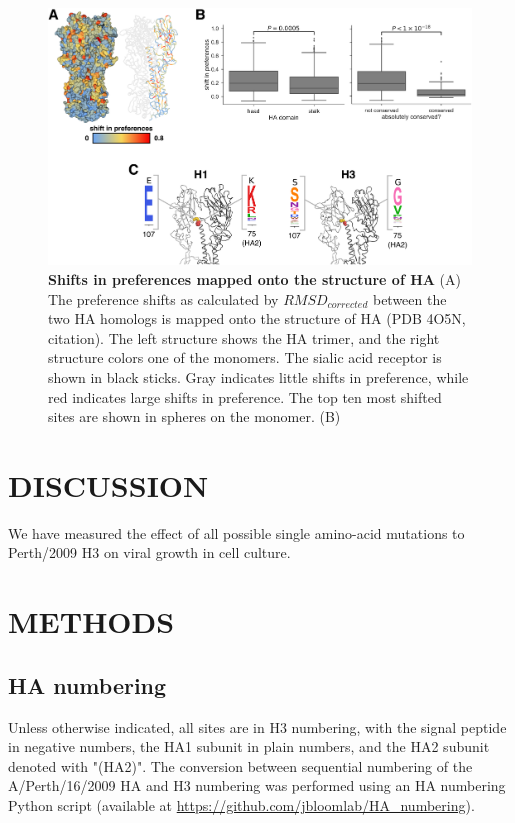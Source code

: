 \documentclass[11pt]{article}
\begin{document}
\begin{figure}
\centerline{\includegraphics[width=\textwidth]{figs/RMSD_heatmap/RMSD_heatmap.pdf}}
\caption{\label{fig:RMSD_heatmap}
{\bf Shifts in preferences mapped onto the structure of HA}
(A) The preference shifts as calculated by $RMSD_{corrected}$ between the two HA homologs is mapped onto the structure of HA (PDB 4O5N, citation). 
The left structure shows the HA trimer, and the right structure colors one of the monomers. 
The sialic acid receptor is shown in black sticks.
Gray indicates little shifts in preference, while red indicates large shifts in preference.
The top ten most shifted sites are shown in spheres on the monomer.
(B)
}
\end{figure}


\section*{DISCUSSION}
We have measured the effect of all possible single amino-acid mutations to Perth/2009 H3 on viral growth in cell culture.

\clearpage
\small

\section*{METHODS}
\label{sec:methods}
\subsection*{HA numbering}
Unless otherwise indicated, all sites are in H3 numbering, with the signal peptide in negative numbers, the HA1 subunit in plain numbers, and the HA2 subunit denoted with "(HA2)". The conversion between sequential numbering of the A/Perth/16/2009 HA and H3 numbering was performed using an HA numbering Python script (available at \url{https://github.com/jbloomlab/HA_numbering}).
\end{document}
